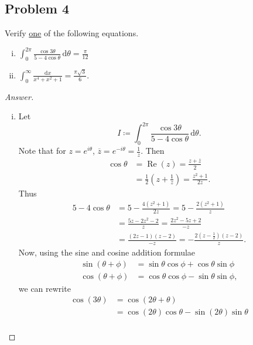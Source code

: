 \documentclass[12pt]{article}
\newcommand\paren[1]{\left( #1 \right)}
\theoremstyle{definition}
\DeclareMathOperator\re{Re}
\begin{document}
\subsection{Problem 4}
Verify \underline{one} of the following equations.
\begin{multicols}{2}
    \begin{enumerate}[(i)]
        \item $\displaystyle \int_0^{2\pi} \frac{\cos 3 \theta}{5 - 4\cos \theta} \, \mathrm{d} \theta = \frac{\pi}{12}$
        \item $\displaystyle \int_0^{\infty} \frac{ \mathrm{d}x}{x^4 + x^2 + 1} = \frac{\pi \sqrt{3}}{6}$.
    \end{enumerate}
\end{multicols}
\begin{proof}[Answer]
    \noindent
    \begin{enumerate}[(i)]
        \item Let 
        \[
            I \coloneqq \int_0^{2\pi} \frac{\cos 3 \theta}{5 - 4\cos \theta} \, \mathrm{d} \theta.
        \]
        Note that for $z = e^{i\theta}$, $\overline{z} = e^{-i \theta} = \frac{1}{z}$. Then 
        \begin{align*}
            \cos \theta & = \re(z) = \frac{z + \overline{z}}{2} \\
            & = \frac{1}{2} \paren{ z + \frac{1}{z} } = \frac{z^2 + 1}{2z}.
        \end{align*}
        Thus 
        \begin{align*}
            5 - 4 \cos \theta & = 5 - \frac{4(z^2+1)}{2z} = 5 - \frac{2(z^2+1)}{z} \\
            & = \frac{5z - 2z^2 - 2}{z} = \frac{2z^2 - 5z + 2}{-z} \\
            & = \frac{(2z-1)(z-2)}{-z} = -\frac{2\paren{ z - \frac{1}{2} }(z-2)}{z}.
        \end{align*}
        Now, using the sine and cosine addition formulae
        \begin{align*}
            \sin(\theta + \phi) & = \sin \theta \cos \phi + \cos \theta \sin \phi \\
            \cos(\theta + \phi) & = \cos \theta \cos \phi - \sin \theta \sin \phi,
        \end{align*}
        we can rewrite
        \begin{align*}
            \cos(3\theta) & = \cos(2\theta + \theta) \\
            & = \cos(2\theta) \cos \theta - \sin(2\theta) \sin \theta \\

\end{align*}
\end{enumerate}
\end{proof}
\end{document}
